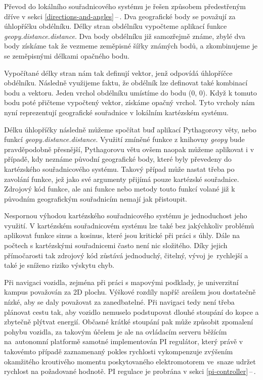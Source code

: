 \documentclass[czech, bachelor]{diploma}
\newcommand{\peteref}[1]{\ref{#1}\,--\,\nameref{#1}}
\begin{document}
Převod do lokálního souřadnicového systému je řešen způsobem předestřeným dříve v sekci \peteref{directions-and-angles}. Dva
geografické body se považují za úhlopříčku obdélníku. Délky stran obdélníku vypočteme aplikací funkce
\emph{geopy.distance.distance}. Dva body obdélníku již samozřejmě známe, zbylé dva body získáme tak že vezmeme zeměpisné šířky
známých bodů, a zkombinujeme je se zeměpisnými délkami opačného bodu.

Vypočítané délky stran nám tak definují vektor, jenž odpovídá úhlopříčce obdélníku. Následně využijeme faktu, že obdélník lze
definovat také kombinací bodu a vektoru. Jeden vrchol obdélníku umístíme do bodu (0, 0). Když k tomuto bodu poté přičteme
vypočtený vektor, získáme opačný vrchol. Tyto vrcholy nám nyní reprezentují geografické souřadnice v lokálním kartézském systému.

Délku úhlopříčky následně můžeme spočítat buď aplikací Pythagorovy věty, nebo funkcí \emph{geopy.distance.distance}. Využití
zmíněné funkce z knihovny \emph{geopy} bude pravděpodobně přesnější, Pythagorovu větu ovšem naopak můžeme aplikovat i v případě,
kdy neznáme původní geografické body, které byly převedeny do kartézského souřadnicového systému. Takový případ může nastat třeba
po zavolání funkce, jež jako své argumenty přijímá pouze kartézské souřadnice. Zdrojový kód funkce, ale ani funkce nebo metody
touto funkcí volané již k původním geografickým souřadnicím nemají jak přistoupit.

Nespornou výhodou kartézského souřadnicového systému je jednoduchost jeho využití. V kartézském souřadnicovém systému lze také
bez jakýchkoliv problémů aplikovat funkce sinus a kosinus, které jsou kritické při práci s úhly. Dále na počtech s kartézskými
souřadnicemi často není nic složitého. Díky jejich přímočarosti tak zdrojový kód zůstává jednoduchý, čitelný, vývoj je~rychlejší
a také je sníženo riziko výskytu chyb.

Při navigaci vozidla, zejména při práci s mapovými podklady, je univerzitní kampus považován za 2D plochu. Výškové rozdíly napříč
areálem jsou dostatečně nízké, aby se daly považovat za zanedbatelné. Při navigaci tedy není třeba plánovat cestu tak, aby vozidlo
nemuselo podstupovat dlouhé stoupání do kopce a zbytečně plýtvat energií. Občasné krátké stoupání pak může způsobit zpomalení
pohybu vozidla, za takovým účelem je ale na ovládacím serveru běžícím na~autonomní platformě samotné implementován PI regulátor,
který právě v takovémto případě zaznamenaný pokles rychlosti vykompenzuje zvýšením okamžitého kroutivého momentu poskytovaného
elektromotorem ve~snaze udržet rychlost na požadované hodnotě. PI regulace je probrána v sekci \peteref{pi-controller}.
\end{document}

